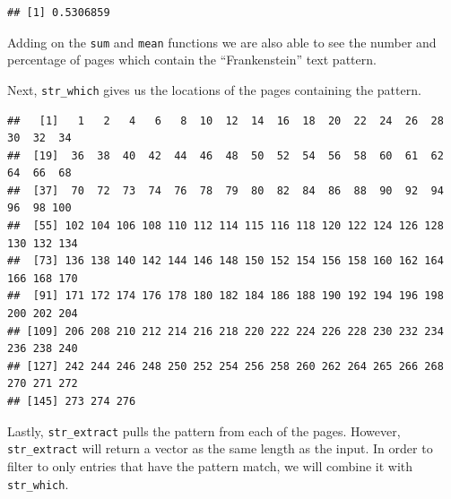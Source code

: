 \documentclass[]{article}
\newenvironment{Shaded}{\begin{snugshade}}{\end{snugshade}}
\newcommand{\KeywordTok}[1]{\textcolor[rgb]{0.13,0.29,0.53}{\textbf{#1}}}
\newcommand{\NormalTok}[1]{#1}
\newcommand{\OperatorTok}[1]{\textcolor[rgb]{0.81,0.36,0.00}{\textbf{#1}}}
\newcommand{\StringTok}[1]{\textcolor[rgb]{0.31,0.60,0.02}{#1}}
\begin{document}
\begin{Shaded}
\end{Shaded}

\begin{verbatim}
## [1] 0.5306859
\end{verbatim}

Adding on the \texttt{sum} and \texttt{mean} functions we are also able
to see the number and percentage of pages which contain the
``Frankenstein'' text pattern.

Next, \texttt{str\_which} gives us the locations of the pages containing
the pattern.

\begin{Shaded}
\end{Shaded}

\begin{verbatim}
##   [1]   1   2   4   6   8  10  12  14  16  18  20  22  24  26  28  30  32  34
##  [19]  36  38  40  42  44  46  48  50  52  54  56  58  60  61  62  64  66  68
##  [37]  70  72  73  74  76  78  79  80  82  84  86  88  90  92  94  96  98 100
##  [55] 102 104 106 108 110 112 114 115 116 118 120 122 124 126 128 130 132 134
##  [73] 136 138 140 142 144 146 148 150 152 154 156 158 160 162 164 166 168 170
##  [91] 171 172 174 176 178 180 182 184 186 188 190 192 194 196 198 200 202 204
## [109] 206 208 210 212 214 216 218 220 222 224 226 228 230 232 234 236 238 240
## [127] 242 244 246 248 250 252 254 256 258 260 262 264 265 266 268 270 271 272
## [145] 273 274 276
\end{verbatim}

Lastly, \texttt{str\_extract} pulls the pattern from each of the pages.
However, \texttt{str\_extract} will return a vector as the same length
as the input. In order to filter to only entries that have the pattern
match, we will combine it with \texttt{str\_which}.
\end{document}
